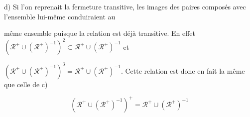 \documentclass{article}
\begin{document}
\vspace{0.3cm}

d) Si l'on reprenait la fermeture transitive, les images des paires composés avec l'ensemble lui-même conduiraient au 

même ensemble puisque la relation est déjà transitive. En effet $(\mathcal{R}^{+} \cup (\mathcal{R}^{+})^{-1})^2 \subset \mathcal{R}^{+} \cup (\mathcal{R}^{+})^{-1}$ et 

$(\mathcal{R}^{+} \cup (\mathcal{R}^{+})^{-1})^3 = \mathcal{R}^{+} \cup (\mathcal{R}^{+})^{-1}$.  Cette relation est donc en fait la même que celle de c) 

$$(\mathcal{R}^{+} \cup (\mathcal{R}^{+})^{-1})^+ = \mathcal{R}^{+} \cup (\mathcal{R}^{+})^{-1}$$
\end{document}
